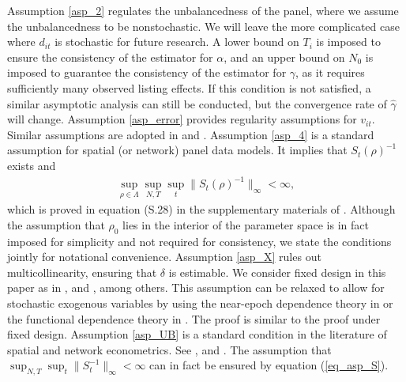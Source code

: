 \documentclass[11pt,a4paper]{article}
\begin{document}
Assumption \ref{asp_2} regulates the unbalancedness of the panel, where we assume the unbalancedness to be nonstochastic. We will leave the more complicated case where $d_{it}$ is stochastic for future research. 
A lower bound on $T_i$ is imposed to ensure the consistency of the estimator for $\alpha$, and an upper bound on $N_0$ is imposed to guarantee the consistency of the estimator for $\gamma$, as it requires sufficiently many observed listing effects. If this condition is not satisfied, a similar asymptotic analysis can still be conducted, but the convergence rate of $\hat{\gamma}$ will change.
Assumption \ref{asp_error} provides regularity assumptions for $v_{it}$. %
Similar assumptions are adopted in \cite{https://doi.org/10.1111/j.1468-0262.2004.00558.x} and \cite{YU2008118}. Assumption \ref{asp_4} is a standard assumption for spatial (or network) panel data models. It implies that $S_t(\rho)^{-1}$ exists and
\begin{align}
\sup_{\rho\in\Lambda}\sup_{N,T}\sup_t\|S_t(\rho)^{-1}\|_{\infty}<\infty,\label{eq_asp_S}
\end{align}
which is proved in equation (S.28) in the supplementary materials of \cite{Wu_Jiang_Xu_2024}.
Although the assumption that $\rho_0$ lies in the interior of the parameter space is in fact imposed for simplicity and not required for consistency, we state the conditions jointly for notational convenience.
Assumption \ref{asp_X} rules out multicollinearity, ensuring that $\delta$ is estimable.
We consider fixed design in this paper as in \cite{https://doi.org/10.1111/j.1468-0262.2004.00558.x,LEE2007489}, \cite{YU2008118} and \cite{LEE2014174}, among others. This assumption can be relaxed to allow for stochastic exogenous variables by using the near-epoch dependence theory in \cite{JENISH2012178} or the functional dependence theory in \cite{Wu_Jiang_Xu_2024}. The proof is similar to the proof under fixed design. 
Assumption \ref{asp_UB} is a standard condition in the literature of spatial and network econometrics. See \cite{https://doi.org/10.1111/j.1468-0262.2004.00558.x,LEE2007489}, \cite{YU2008118} and \cite{LEE2014174}. The assumption that $\sup_{N,T}\sup_t\|S_t^{-1}\|_\infty<\infty$ can in fact be ensured by equation (\ref{eq_asp_S}).
\end{document}
